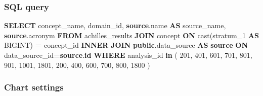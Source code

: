 \documentclass[
]{book}
\newenvironment{Shaded}{\begin{snugshade}}{\end{snugshade}}
\newcommand{\DecValTok}[1]{\textcolor[rgb]{0.00,0.00,0.81}{#1}}
\newcommand{\FunctionTok}[1]{\textcolor[rgb]{0.00,0.00,0.00}{#1}}
\newcommand{\KeywordTok}[1]{\textcolor[rgb]{0.13,0.29,0.53}{\textbf{#1}}}
\newcommand{\NormalTok}[1]{#1}
\newcommand{\OperatorTok}[1]{\textcolor[rgb]{0.81,0.36,0.00}{\textbf{#1}}}
\begin{document}
\hypertarget{sql-query-21}{%
\subsubsection*{SQL query}\label{sql-query-21}}

\begin{Shaded}
\begin{Highlighting}[]
\KeywordTok{SELECT}\NormalTok{ concept\_name,}
\NormalTok{     domain\_id,}
     \KeywordTok{source}\NormalTok{.name }\KeywordTok{AS}\NormalTok{ source\_name,}
     \KeywordTok{source}\NormalTok{.acronym}
\KeywordTok{FROM}\NormalTok{ achilles\_results }\KeywordTok{JOIN}\NormalTok{ concept}
  \KeywordTok{ON} \FunctionTok{cast}\NormalTok{(stratum\_1 }\KeywordTok{AS}\NormalTok{ BIGINT) }\OperatorTok{=}\NormalTok{ concept\_id}
\KeywordTok{INNER} \KeywordTok{JOIN} \KeywordTok{public}\NormalTok{.data\_source }\KeywordTok{AS} \KeywordTok{source}
  \KeywordTok{ON}\NormalTok{ data\_source\_id}\OperatorTok{=}\KeywordTok{source}\NormalTok{.}\KeywordTok{id}
\KeywordTok{WHERE}
\NormalTok{  analysis\_id }\KeywordTok{in}\NormalTok{ (}
    \DecValTok{201}\NormalTok{, }\DecValTok{401}\NormalTok{, }\DecValTok{601}\NormalTok{, }\DecValTok{701}\NormalTok{, }\DecValTok{801}\NormalTok{, }\DecValTok{901}\NormalTok{, }\DecValTok{1001}\NormalTok{, }\DecValTok{1801}\NormalTok{,}
    \DecValTok{200}\NormalTok{, }\DecValTok{400}\NormalTok{, }\DecValTok{600}\NormalTok{, }\DecValTok{700}\NormalTok{, }\DecValTok{800}\NormalTok{, }\DecValTok{1800}
\NormalTok{  )}
\end{Highlighting}
\end{Shaded}

\hypertarget{chart-settings-22}{%
\subsubsection*{Chart settings}\label{chart-settings-22}}
\end{document}
